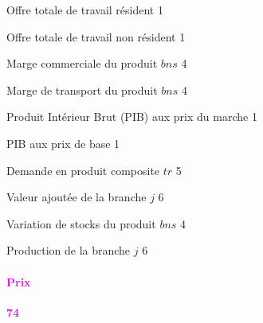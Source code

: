 \documentclass[11pt,a4paper]{article}
\newcommand{\bns}{\mathit{bns}}
\newcommand{\tr}{\mathit{tr}}
\newcommand{\LS}{\mathit{LS}}
\newcommand{\MRGCOM}{\mathit{MRGCOM}}
\newcommand{\MRGTRP}{\mathit{MRGTRP}}
\newcommand{\PIB}{\mathit{PIB}}
\newcommand{\VA}{\mathit{VA}}
\newcommand{\VSTK}{\mathit{VSTK}}
\newcommand{\XS}{\mathit{XS}}
\newcommand{\redparagraph}[1]{\paragraph*{\large\textcolor{Fuchsia}{#1}}}
\begin{document}
\begin{description}[leftmargin=!,labelwidth=\widthof{\bfseries AAAAAAAA},parsep=9.7pt]
		\item[$\LS$]			Offre totale de travail résident				\hfill 1
				\item[$\LS^R$]			Offre totale de travail non résident				\hfill 1
		\item[$\MRGCOM_{\bns}$]	Marge commerciale du produit $\bns$ 	\hfill 4
		\item[$\MRGTRP_{\bns}$]	Marge de transport du produit $\bns$ 	\hfill 4
		\item[$\PIB^{\mathit{MP}_\mathit{reel}}$] Produit Intérieur Brut (PIB) aux prix du marche \hfill 1
		\item[$\PIB^{\mathit{BP}_\mathit{reel}}$] PIB aux prix de base 	\hfill 1
		\item[$Q_{\tr}$]		Demande en produit composite $\tr$ 		\hfill 5
		\item[$\VA_j$]			Valeur ajoutée de la branche $j$ 		\hfill 6
		\item[$\VSTK_{\bns}$]	Variation de stocks du produit $\bns$	\hfill 4
		\item[$\XS_j$]			Production de la branche $j$ 			\hfill 6
	\end{description}
	\redparagraph{Prix}\hfill \textcolor{Fuchsia}{\textbf{74}} 
\end{document}
